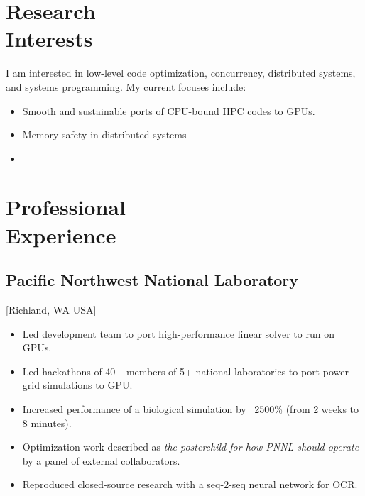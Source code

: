 \documentclass{mycv}
\begin{document}
\maketitle%

\section{Research \\ Interests}

I am interested in low-level code optimization, concurrency, distributed systems, and systems programming.
My current focuses include:

\begin{itemize}
  \item Smooth and sustainable ports of CPU-bound HPC codes to GPUs.
  \item Memory safety in distributed systems
  \item
\end{itemize}

\section{Professional \\ Experience}

\subsection{Pacific Northwest National Laboratory}[Richland, WA USA]
\begin{positions}
\end{positions}

\begin{itemize}
  \item Led development team to port high-performance linear solver to run on GPUs.
  \item Led hackathons of 40+ members of 5+ national laboratories to port power-grid simulations to GPU.
  \item Increased performance of a biological simulation by ~2500\% (from 2 weeks to 8 minutes).
  \item Optimization work described as \textit{the posterchild for how PNNL should operate} by a panel of external collaborators.
  \item Reproduced closed-source research with a seq-2-seq neural network for OCR.
\end{itemize}
\end{document}
